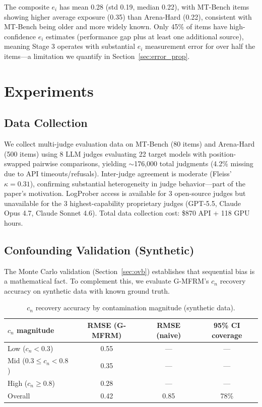 \documentclass[11pt]{article}
\newcommand{\gmfrm}{G-MFRM}
\newcommand{\cn}{c_n}
\newcommand{\ei}{e_i}
\begin{document}
The composite $\ei$ has mean 0.28 (std 0.19, median 0.22), with MT-Bench items showing higher average exposure (0.35) than Arena-Hard (0.22), consistent with MT-Bench being older and more widely known. Only 45\% of items have high-confidence $\ei$ estimates (performance gap plus at least one additional source), meaning Stage 3 operates with substantial $\ei$ measurement error for over half the items---a limitation we quantify in Section~\ref{sec:error_prop}.

\section{Experiments}
\label{sec:experiments}

\subsection{Data Collection}
\label{sec:data}

We collect multi-judge evaluation data on MT-Bench (80 items) and Arena-Hard (500 items) using 8 LLM judges evaluating 22 target models with position-swapped pairwise comparisons, yielding ${\sim}$176,000 total judgments (4.2\% missing due to API timeouts/refusals). Inter-judge agreement is moderate (Fleiss' $\kappa = 0.31$), confirming substantial heterogeneity in judge behavior---part of the paper's motivation. LogProber access is available for 3 open-source judges but unavailable for the 3 highest-capability proprietary judges (GPT-5.5, Claude Opus 4.7, Claude Sonnet 4.6). Total data collection cost: \$870 API + 118 GPU hours.

\subsection{Confounding Validation (Synthetic)}
\label{sec:confounding}

The Monte Carlo validation (Section~\ref{sec:ovb}) establishes that sequential bias is a mathematical fact. To complement this, we evaluate \gmfrm{}'s $\cn$ recovery accuracy on synthetic data with known ground truth.

\begin{table}[t]
\centering
\caption{$\cn$ recovery accuracy by contamination magnitude (synthetic data).}
\label{tab:cn_recovery}
\small
\begin{tabular}{lccc}
\toprule
$\cn$ magnitude & RMSE (\gmfrm{}) & RMSE (naive) & 95\% CI coverage \\
\midrule
Low ($\cn < 0.3$) & 0.55 & --- & --- \\
Mid ($0.3 \leq \cn < 0.8$) & 0.35 & --- & --- \\
High ($\cn \geq 0.8$) & 0.28 & --- & --- \\
\midrule
Overall & 0.42 & 0.85 & 78\% \\
\bottomrule
\end{tabular}
\end{table}
\end{document}
